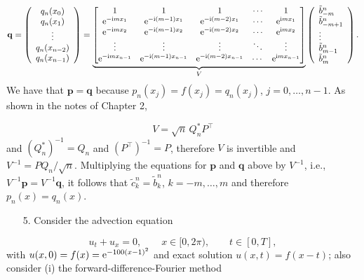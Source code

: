 \documentclass[12pt,a4paper]{article}
\begin{document}
\[
\mathbf{q} = \left(
\begin{array}{c}
q_n(x_0) \\
q_n(x_1) \\
\vdots \\
q_n(x_{n-2}) \\
q_n(x_{n-1})
\end{array}
\right)
=
\underbrace{\begin{bmatrix}
1 & 1 & 1&  \ensuremath{\cdots} & 1 \\
{\rm e}^{-{\rm i}m x_1} & {\rm e}^{-{\rm i}(m-1) x_1} &  {\rm e}^{-{\rm i}(m-2) x_1} & \ensuremath{\cdots} & {\rm e}^{{\rm i} m x_1} \\
{\rm e}^{-{\rm i}m x_2} & {\rm e}^{-{\rm i}(m-1) x_2} &  {\rm e}^{-{\rm i}(m-2) x_2} & \ensuremath{\cdots} & {\rm e}^{{\rm i} m x_2} \\
\ensuremath{\vdots} & \ensuremath{\vdots} & \ensuremath{\vdots} & \ensuremath{\ddots} & \ensuremath{\vdots} \\
{\rm e}^{-{\rm i}m x_{n-1}}& {\rm e}^{-{\rm i}(m-1)x_{n-1}}& {\rm e}^{-{\rm i}(m-2)x_{n-1}}& \cdots & {\rm e}^{{\rm i}m x_{n-1}}
\end{bmatrix}}_{V} 
\left(
\begin{array}{l}
\tilde{b}^n_{-m} \\
\tilde{b}^n_{-m+1} \\
\vdots \\
\tilde{b}^n_{m-1} \\
\tilde{b}^n_{m}
\end{array}
\right).
\]
We have that $\mathbf{p} = \mathbf{q}$ because $p_n(x_j) = f(x_j) = q_n(x_j)$, $j = 0, \ldots, n-1$.  As shown in the notes of Chapter 2, 

\[
V = \sqrt{n}\,Q_n^*P^{\top}
\]
and $\left(Q_n^*\right)^{-1} = Q_n$ and $\left(P^{\top}\right)^{-1} = P$, therefore $V$ is invertible and $V^{-1} = PQ_n/\sqrt{n}$.  Multiplying the equations for $\mathbf{p}$ and $\mathbf{q}$ above by $V^{-1}$, i.e., $V^{-1}\mathbf{p} = V^{-1}\mathbf{q}$,  it follows that $\tilde{c}^{n}_k = \tilde{b}^n_k$, $k = -m, \ldots, m$ and therefore $p_n(x) = q_n(x)$.

\begin{itemize}
\item[5. ] Consider the advection equation

\end{itemize}
\[
   u_t + u_x = 0, \qquad x \in [0, 2\pi), \qquad t \in [0, T],
\]
with $u(x,0) = f(x) = {\rm e}^{-100(x-1)^2}$ and exact solution $u(x,t) = f(x - t)$; also consider (i) the forward-difference-Fourier    method 
\end{document}
